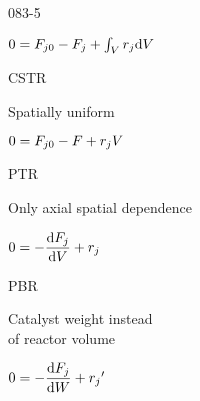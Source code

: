 \begin{mitframe}{083-5}


\begin{listone}
	\item $0=\force_{j\init}-\force_{j}+\int_{\vol}\pos_{j}\mathrm{d}\vol$
	
    \begin{listtwo}
		\item CSTR
		
        \begin{listthree}
			\item Spatially uniform
			\item $0=\force_{j\init}-\force+\pos_{j}\vol$
		\end{listthree}
		
        \item PTR
		
        \begin{listthree}
			\item Only axial spatial dependence
			\item $0=-\dfrac{\mathrm{d}\force_{j}}{\mathrm{d}\vol}+\pos_{j}$
			\item PBR
			
            \begin{listfour}
				\item Catalyst weight instead\\
                		of reactor volume
				\item $0=-\dfrac{\mathrm{d}\force_{j}}{\mathrm{d}\work}+{\pos_{j}}'$
			\end{listfour}
		
        \end{listthree}
        
	\end{listtwo}

\end{listone}

\end{mitframe}